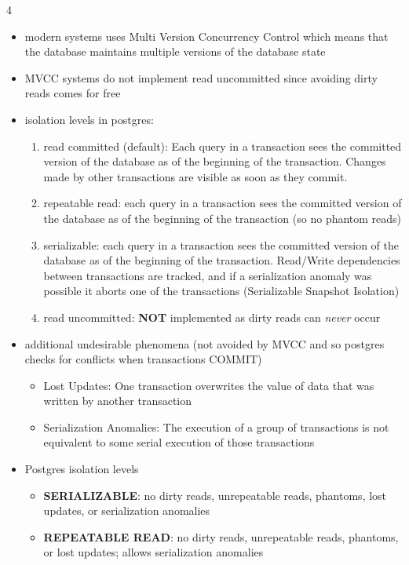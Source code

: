 \documentclass[8pt,landscape]{article}
\begin{document}
\begin{multicols*}{4}
\begin{itemize}[leftmargin=*]
\begin{itemize}
		\end{itemize}
  \item modern systems uses Multi Version Concurrency Control which means that the database maintains multiple versions of the database state
  \item MVCC systems do not implement read uncommitted since avoiding dirty reads comes for free
  \item isolation levels in postgres:
    \begin{enumerate}
      \item read committed (default): Each query in a transaction sees the committed version of the database as of the beginning of the transaction. Changes made by other transactions are visible as soon as they commit.
      \item repeatable read: each query in a transaction sees the committed version of the database as of the beginning of the transaction (so no phantom reads)
      \item serializable: each query in a transaction sees the committed version of the database as of the beginning of the transaction. Read/Write dependencies between transactions are tracked, and if a serialization anomaly was possible
        it aborts one of the transactions (Serializable Snapshot Isolation)
      \item read uncommitted: \textbf{NOT} implemented as dirty reads can \textit{never} occur
      \end{enumerate}
    \item additional undesirable phenomena (not avoided by MVCC and so postgres checks for conflicts when transactions COMMIT)
      \begin{itemize}
        \item Lost Updates: One transaction overwrites the value of data that was written by another transaction
        \item Serialization Anomalies: The execution of a group of transactions is not equivalent to some serial execution of those transactions
  \end{itemize}
\item Postgres isolation levels
  \begin{itemize}[leftmargin=*]
    \item \textbf{SERIALIZABLE}: no dirty reads, unrepeatable reads, phantoms, lost updates, or serialization anomalies
    \item \textbf{REPEATABLE READ}: no dirty reads, unrepeatable reads, phantoms, or lost updates; allows serialization anomalies

\end{itemize}
\end{itemize}
\end{multicols*}
\end{document}
